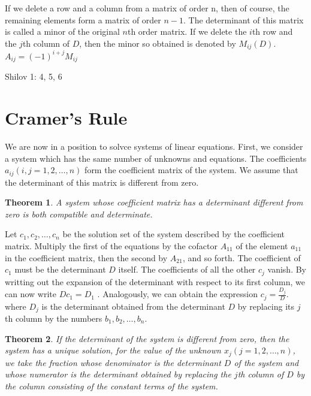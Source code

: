 \documentclass[11pt]{article} %
\newtheorem{theorem}{Theorem}[section]
\newenvironment{proof}[1][Proof]{\begin{trivlist}
\item[\hskip \labelsep {\bfseries #1}]}{\end{trivlist}}
\newenvironment{definition}[1][Definition]{\begin{trivlist}
\item[\hskip \labelsep {\bfseries #1}]}{\end{trivlist}}
\newenvironment{assignment}[1][Assignment]{\begin{trivlist}
\item[\hskip \labelsep {\bfseries #1}]}{\end{trivlist}}
\begin{document}
\begin{definition}
	If we delete a row and a column from a matrix of order n, then of course, the remaining elements form a matrix of order $n - 1$. The determinant of this matrix is called a minor of the original $n$th order matrix. If we delete the $i$th row and the $j$th column of $D$, then the minor so obtained is denoted by $M_{ij}(D)$. 
	{\center
		$A_{ij} = (-1)^{i + j}M_{ij} $
	}
\end{definition}

\begin{assignment}
	Shilov 1: 4, 5, 6
\end{assignment}

\section{Cramer's Rule}

\begin{definition}
	We are now in a position to solvce systems of linear equations. First, we consider a system which has the same number of unknowns and equations. The coefficients $a_{ij} (i, j = 1, 2, \ldots, n)$ form the coefficient matrix of the system. We assume that the determinant of this matrix is different from zero. 
\end{definition}

\begin{theorem}
	A system whose coefficient matrix has a determinant different from zero is both compatible and determinate.
\end{theorem}

\begin{proof}
	Let $c_1, c_2,\ldots, c_n$ be the solution set of the system described by the coefficient matrix. Multiply the first of the equations by the cofactor $A_{11}$ of the element $a_{11}$ in the coefficient matrix, then the second by $A_{21}$, and so forth. The coefficient of $c_1$ must be the determinant $D$ itself. The coefficients of all the other $c_j$ vanish. By writting out the expansion of the determinant with respect to its first column, we can now write
	{\center
		$Dc_1 = D_1$ 
	}.
Analogously, we can obtain the expression
	{\center
		$c_j = \frac{D_j}{D}$. 
	}
where $D_j$ is the determinant obtained from the determinant $D$ by replacing its $j$th column by the numbers $b_1, b_2, \ldots, b_n$. 
\end{proof}

\begin{theorem}
	If the determinant of the system is different from zero, then the system has a unique solution, for the value of the unknown $x_j (j = 1, 2, \ldots, n)$, we take the fraction whose denominator is the determinant $D$ of the system and whose numerator is the determinant obtained by replacing the $j$th column of $D$ by the column consisting of the constant terms of the system. 
\end{theorem}
\end{document}
